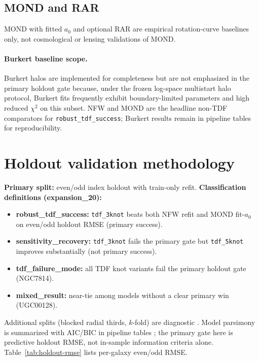 \documentclass[11pt,a4paper]{article}
\begin{document}
\subsection{MOND and RAR}
MOND \cite{milgrom1983,famaey2012} with fitted $a_0$ and optional RAR \cite{mcgaugh2016}
are empirical rotation-curve baselines only, not cosmological or lensing validations of MOND.

\paragraph{Burkert baseline scope.}
Burkert \cite{burkert1995} halos are implemented for completeness but are not emphasized in the
primary holdout gate because, under the frozen log-space multistart halo protocol, Burkert fits frequently exhibit
boundary-limited parameters and high reduced $\chi^2$ on this subset. NFW \cite{navarro1997} and
MOND \cite{milgrom1983,famaey2012} are the headline non-TDF comparators for
\texttt{robust\_tdf\_success}; Burkert results remain in pipeline tables for reproducibility.


\section{Holdout validation methodology}
\textbf{Primary split:} even/odd index holdout with train-only refit. \textbf{Classification
definitions (expansion\_20):}
\begin{itemize}
  \item \textbf{robust\_tdf\_success:} \texttt{tdf\_3knot} beats both NFW refit and MOND
  fit-$a_0$ on even/odd holdout RMSE (primary success).
  \item \textbf{sensitivity\_recovery:} \texttt{tdf\_3knot} fails the primary gate but
  \texttt{tdf\_5knot} improves substantially (not primary success).
  \item \textbf{tdf\_failure\_mode:} all TDF knot variants fail the primary holdout gate
  (NGC7814).
  \item \textbf{mixed\_result:} near-tie among models without a clear primary win (UGC00128).
\end{itemize}
Additional splits (blocked radial thirds, $k$-fold) are diagnostic
\cite{stone1974,arlot2010}. Model parsimony is summarized with AIC/BIC in pipeline tables
\cite{akaike1974,schwarz1978}; the primary gate here is predictive holdout RMSE, not in-sample
information criteria alone. Table~\ref{tab:holdout-rmse} lists per-galaxy even/odd RMSE.


\end{document}
